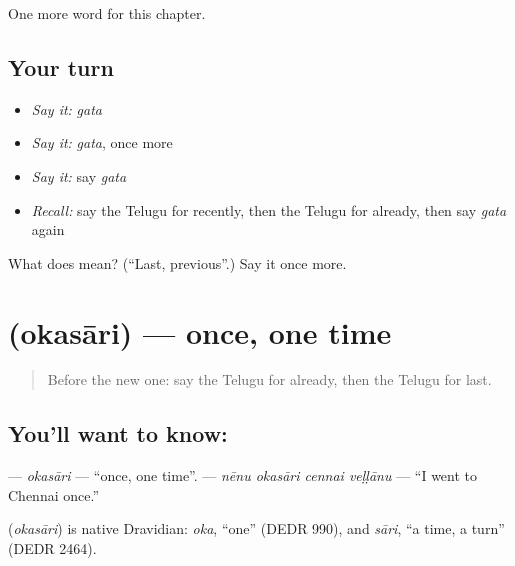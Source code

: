 \begin{grammarlens}[title={What you've built}]
One more word for this chapter.
\end{grammarlens}

\subsection*{Your turn}
\begin{itemize}
\raggedright
  \item \emph{Say it:} \emph{gata}
  \item \emph{Say it:} \emph{gata}, once more
  \item \emph{Say it:} say \emph{gata}
  \item \emph{Recall:} say the Telugu for recently, then the Telugu for already, then say \emph{gata} again
\end{itemize}

\begin{tcolorbox}[breakable,colback=teal!4,colframe=teal!35!black,title={Before you move on}]
What does  mean? (\textquotedblleft{}Last, previous\textquotedblright{}.) Say it once more.
\end{tcolorbox}
\section[\texorpdfstring{\te{ఒకసారి} (okasāri)}{ఒకసారి (okasāri)}]{ (okasāri) — once, one time}

\label{lesson:TE-C154-okasari}



\begin{quote}
Before the new one: say the Telugu for already, then the Telugu for last.
\end{quote}

\subsection*{You'll want to know: }
\textbf{} — \emph{okasāri} — \textquotedblleft{}once, one time\textquotedblright{}. \textbf{   } — \emph{nēnu okasāri cennai veḷḷānu} — \textquotedblleft{}I went to Chennai once.\textquotedblright{}

\begin{cousinweb}
\textbf{} (\emph{okasāri}) is native Dravidian: \emph{oka}, \textquotedblleft{}one\textquotedblright{} (DEDR 990), and \emph{sāri}, \textquotedblleft{}a time, a turn\textquotedblright{} (DEDR 2464).
\end{cousinweb}

